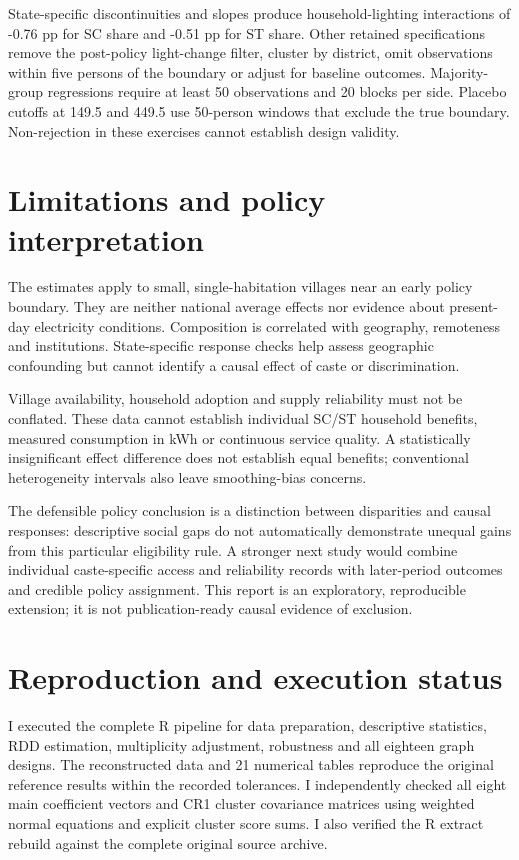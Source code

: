 \documentclass[11pt,a4paper]{article}
\begin{document}
State-specific discontinuities and slopes produce household-lighting interactions of -0.76 pp for SC share and -0.51 pp for ST share. Other retained specifications remove the post-policy light-change filter, cluster by district, omit observations within five persons of the boundary or adjust for baseline outcomes. Majority-group regressions require at least 50 observations and 20 blocks per side. Placebo cutoffs at 149.5 and 449.5 use 50-person windows that exclude the true boundary. Non-rejection in these exercises cannot establish design validity.

\section{Limitations and policy interpretation}
The estimates apply to small, single-habitation villages near an early policy boundary. They are neither national average effects nor evidence about present-day electricity conditions. Composition is correlated with geography, remoteness and institutions. State-specific response checks help assess geographic confounding but cannot identify a causal effect of caste or discrimination.

Village availability, household adoption and supply reliability must not be conflated. These data cannot establish individual SC/ST household benefits, measured consumption in kWh or continuous service quality. A statistically insignificant effect difference does not establish equal benefits; conventional heterogeneity intervals also leave smoothing-bias concerns.

The defensible policy conclusion is a distinction between disparities and causal responses: descriptive social gaps do not automatically demonstrate unequal gains from this particular eligibility rule. A stronger next study would combine individual caste-specific access and reliability records with later-period outcomes and credible policy assignment. This report is an exploratory, reproducible extension; it is not publication-ready causal evidence of exclusion.

\section{Reproduction and execution status}
I executed the complete R pipeline for data preparation, descriptive statistics, RDD estimation, multiplicity adjustment, robustness and all eighteen graph designs. The reconstructed data and 21 numerical tables reproduce the original reference results within the recorded tolerances. I independently checked all eight main coefficient vectors and CR1 cluster covariance matrices using weighted normal equations and explicit cluster score sums. I also verified the R extract rebuild against the complete original source archive.
\end{document}
